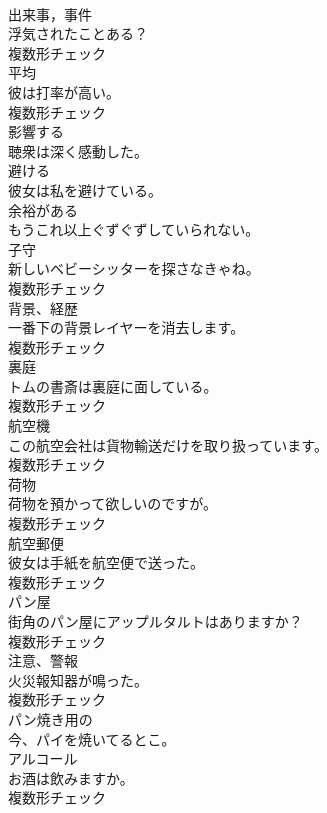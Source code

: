 \documentclass[8pt]{extreport}
\begin{document}
\begin{CJK}{UTF8}{min}
\\	[名詞]	出来事，事件	
\\	浮気されたことある？	
\\	複数形チェック
\\	[名詞]	平均	
\\	彼は打率が高い。	
\\	複数形チェック
\\	[動詞]	影響する	
\\	聴衆は深く感動した。	
\\	[動詞]	避ける	
\\	彼女は私を避けている。	
\\	[動詞]	余裕がある	
\\	もうこれ以上ぐずぐずしていられない。	
\\	[名詞]	子守	
\\	新しいベビーシッターを探さなきゃね。	
\\	複数形チェック
\\	[名詞]	背景、経歴	
\\	一番下の背景レイヤーを消去します。	
\\	複数形チェック
\\	[名詞]	裏庭	
\\	トムの書斎は裏庭に面している。	
\\	複数形チェック
\\	[名詞]	航空機	
\\	この航空会社は貨物輸送だけを取り扱っています。	
\\	複数形チェック
\\	[名詞]	荷物	
\\	荷物を預かって欲しいのですが。	
\\	複数形チェック
\\	[名詞]	航空郵便	
\\	彼女は手紙を航空便で送った。	
\\	複数形チェック
\\	[名詞]	パン屋	
\\	街角のパン屋にアップルタルトはありますか？	
\\	複数形チェック
\\	[名詞]	注意、警報	
\\	火災報知器が鳴った。	
\\	複数形チェック
\\	[形容詞]	パン焼き用の	
\\	今、パイを焼いてるとこ。	
\\	[名詞]	アルコール	
\\	お酒は飲みますか。	
\\	複数形チェック

\end{CJK}
\end{document}
